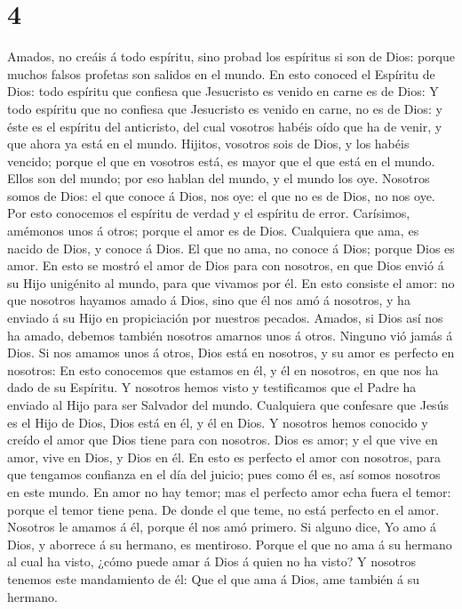 \hypertarget{section-3}{%
\section{4}\label{section-3}}

 Amados, no creáis á todo espíritu, sino probad los
espíritus si son de Dios: porque muchos falsos profetas son salidos en
el mundo.  En esto conoced el Espíritu de Dios: todo
espíritu que confiesa que Jesucristo es venido en carne es de Dios:
 Y todo espíritu que no confiesa que Jesucristo es venido en
carne, no es de Dios: y éste es el espíritu del anticristo, del cual
vosotros habéis oído que ha de venir, y que ahora ya está en el mundo.
 Hijitos, vosotros sois de Dios, y los habéis vencido;
porque el que en vosotros está, es mayor que el que está en el mundo.
 Ellos son del mundo; por eso hablan del mundo, y el mundo
los oye.  Nosotros somos de Dios: el que conoce á Dios, nos
oye: el que no es de Dios, no nos oye. Por esto conocemos el espíritu de
verdad y el espíritu de error.  Carísimos, amémonos unos á
otros; porque el amor es de Dios. Cualquiera que ama, es nacido de Dios,
y conoce á Dios.  El que no ama, no conoce á Dios; porque
Dios es amor.  En esto se mostró el amor de Dios para con
nosotros, en que Dios envió á su Hijo unigénito al mundo, para que
vivamos por él.  En esto consiste el amor: no que nosotros
hayamos amado á Dios, sino que él nos amó á nosotros, y ha enviado á su
Hijo en propiciación por nuestros pecados.  Amados, si Dios
así nos ha amado, debemos también nosotros amarnos unos á otros.
 Ninguno vió jamás á Dios. Si nos amamos unos á otros, Dios
está en nosotros, y su amor es perfecto en nosotros:  En
esto conocemos que estamos en él, y él en nosotros, en que nos ha dado
de su Espíritu.  Y nosotros hemos visto y testificamos que
el Padre ha enviado al Hijo para ser Salvador del mundo. 
Cualquiera que confesare que Jesús es el Hijo de Dios, Dios está en él,
y él en Dios.  Y nosotros hemos conocido y creído el amor
que Dios tiene para con nosotros. Dios es amor; y el que vive en amor,
vive en Dios, y Dios en él.  En esto es perfecto el amor
con nosotros, para que tengamos confianza en el día del juicio; pues
como él es, así somos nosotros en este mundo.  En amor no
hay temor; mas el perfecto amor echa fuera el temor: porque el temor
tiene pena. De donde el que teme, no está perfecto en el amor.
 Nosotros le amamos á él, porque él nos amó primero.
 Si alguno dice, Yo amo á Dios, y aborrece á su hermano, es
mentiroso. Porque el que no ama á su hermano al cual ha visto, ¿cómo
puede amar á Dios á quien no ha visto?  Y nosotros tenemos
este mandamiento de él: Que el que ama á Dios, ame también á su hermano.

